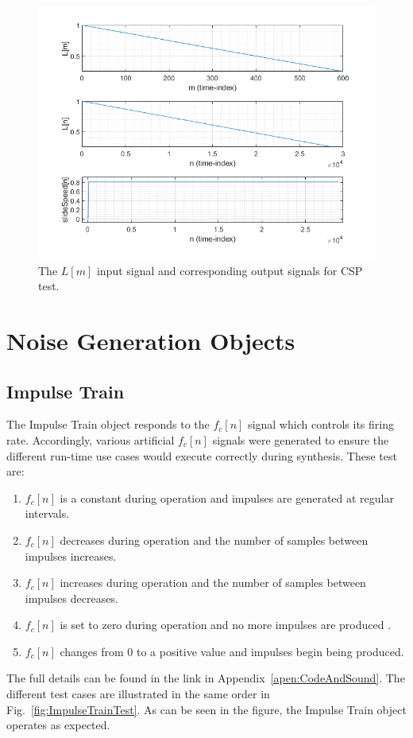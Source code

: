\documentclass[../main.tex]{subfiles}
\begin{document}
\begin{figure}[h]
    \centering
    \includegraphics[scale=.65]{./images/plots/CSPTest.png}
    \caption{The $L[m]$ input signal and corresponding output signals for CSP test.}
    \label{fig:CSPTest}
\end{figure}

\section{Noise Generation Objects}
\subsection{Impulse Train}
The Impulse Train object responds to the $f_c[n]$ signal which controls its firing rate. Accordingly, various artificial $f_c[n]$ signals were generated to ensure the different run-time use cases would execute correctly during synthesis. These test are:
\begin{enumerate}
    \item $f_c[n]$ is a constant during operation and impulses are generated at regular intervals.
    \item $f_c[n]$ decreases during operation and the number of samples between impulses increases.
    \item $f_c[n]$ increases during operation and the number of samples between impulses decreases.
    \item $f_c[n]$ is set to zero during operation and no more impulses are produced .
    \item $f_c[n]$ changes from 0 to a positive value and impulses begin being produced.
\end{enumerate}
The full details can be found in the link in Appendix~\ref{apen:CodeAndSound}. The different test cases are illustrated in the same order in Fig.~\ref{fig:ImpulseTrainTest}. As can be seen in the figure, the Impulse Train object operates as expected. 
\end{document}
